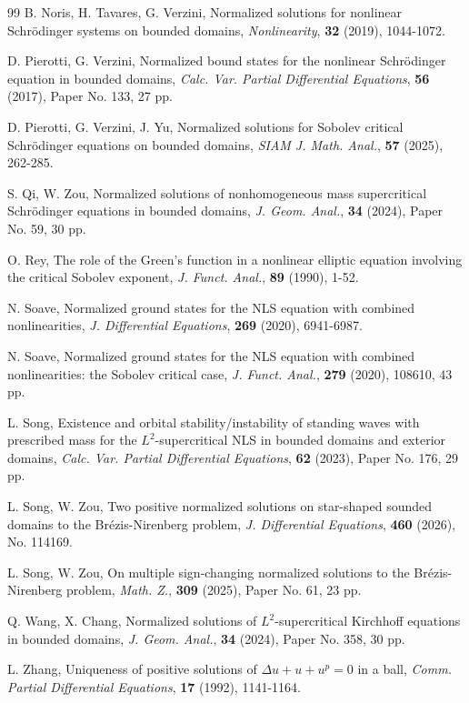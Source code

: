 \documentclass[10pt]{article}
\numberwithin{equation}{section}
\numberwithin{equation}{section}
\begin{document}
\begin{thebibliography}{99}
 B. Noris, H. Tavares, G. Verzini, Normalized solutions for nonlinear Schr\"{o}dinger systems on bounded domains, {\it Nonlinearity}, {\bf 32} (2019), 1044-1072.

 D. Pierotti, G. Verzini, Normalized bound states for the nonlinear Schr\"{o}dinger equation in bounded domains, {\it Calc. Var. Partial Differential Equations}, {\bf 56} (2017), Paper No. 133, 27 pp.

 D. Pierotti, G. Verzini, J. Yu, Normalized solutions for Sobolev critical Schr\"{o}dinger equations on bounded domains, {\it SIAM J. Math. Anal.}, {\bf 57} (2025), 262-285.

 S. Qi, W. Zou, Normalized solutions of nonhomogeneous mass supercritical Schr\"{o}dinger equations in bounded domains, {\it J. Geom. Anal.}, {\bf 34} (2024), Paper No. 59, 30 pp.

 O. Rey,  The role of the Green's function in a nonlinear elliptic equation involving the critical Sobolev exponent, {\it J. Funct. Anal.}, {\bf 89} (1990),  1-52.

 N. Soave, Normalized ground states for the NLS equation with combined nonlinearities, {\it J. Differential Equations}, {\bf 269} (2020), 6941-6987.

N. Soave, Normalized ground states for the NLS equation with combined nonlinearities: the Sobolev critical case, {\it J. Funct. Anal.}, {\bf 279} (2020), 108610, 43 pp.

 L. Song, Existence and orbital stability/instability of standing waves with prescribed mass for the $L^2$-supercritical NLS in bounded domains and exterior domains, {\it Calc. Var. Partial Differential Equations}, {\bf 62} (2023), Paper No. 176, 29 pp.

 L. Song, W. Zou, Two positive normalized solutions on star-shaped sounded domains to the Br\'{e}zis-Nirenberg problem, {\it J. Differential Equations}, {\bf 460} (2026), No. 114169.

 L. Song, W. Zou, On multiple sign-changing normalized solutions to the Br\'{e}zis-Nirenberg problem, {\it Math. Z.}, {\bf 309} (2025), Paper No. 61, 23 pp.

 Q. Wang, X. Chang, Normalized solutions of $L^2$-supercritical Kirchhoff equations in bounded domains, {\it J. Geom. Anal.}, {\bf 34} (2024), Paper No. 358, 30 pp.

 L. Zhang, Uniqueness of positive solutions of $\Delta u+u+u^p=0$ in a ball, {\it Comm. Partial Differential Equations}, {\bf 17} (1992), 1141-1164.


\end{thebibliography}
\end{document}
